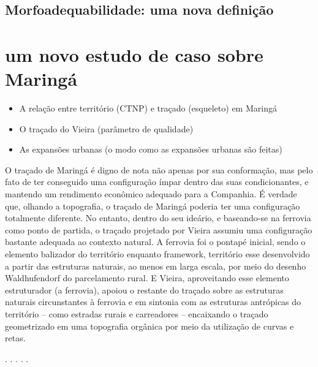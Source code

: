 \documentclass[12pt, a4paper]{book} %
\begin{document}
            \section{Morfoadequabilidade: uma nova definição} %

        \chapter[Maringá: um novo estudo de caso]{um novo estudo de caso sobre Maringá}

        \begin{itemize} %
            \item A relação entre território (CTNP) e traçado (esqueleto) em Maringá
            \item O traçado do Vieira (parâmetro de qualidade)
            \item As expansões urbanas (o modo como as expansões urbanas são feitas)
        \end{itemize}

        O traçado de Maringá é digno de nota não apenas por sua conformação, mas pelo fato de ter conseguido uma configuração ímpar dentro das suas condicionantes, e mantendo um rendimento econômico adequado para a Companhia. É verdade que, olhando a topografia, o traçado de Maringá poderia ter uma configuração totalmente diferente. No entanto, dentro do seu ideário, e baseando-se na ferrovia como ponto de partida, o traçado projetado por Vieira assumiu uma configuração bastante adequada ao contexto natural. A ferrovia foi o pontapé inicial, sendo o elemento balizador do território enquanto framework, território esse desenvolvido a partir das estruturas naturais, ao menos em larga escala, por meio do desenho Waldhufendorf do parcelamento rural. E Vieira, aproveitando esse elemento estruturador (a ferrovia), apoiou o restante do traçado sobre as estruturas naturais circunstantes à ferrovia e em sintonia com as estruturas antrópicas do território – como estradas rurais e carreadores – encaixando o traçado geometrizado em uma topografia orgânica por meio da utilização de curvas e retas.

        \begin{center}
        . . . . .
        \end{center} 
\end{document}
